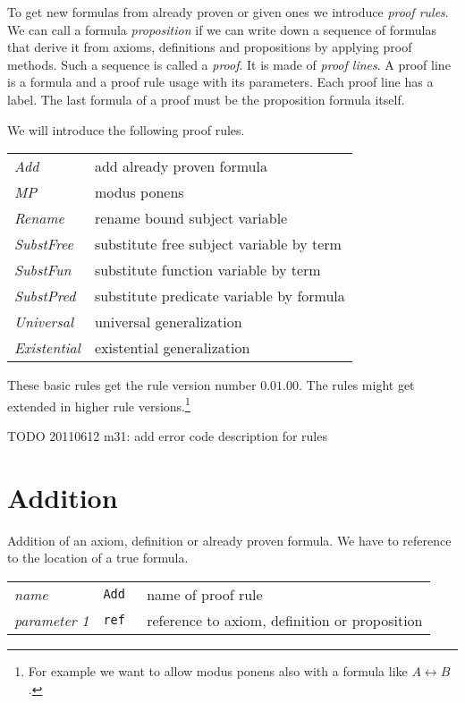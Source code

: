 \documentclass[a4paper,german,10pt,twoside]{book}
\theoremstyle{definition}
\theoremstyle{remark}
\begin{document}
To get new formulas from already proven or given ones we introduce \emph{proof rules}. We can call a formula \emph{proposition} if we can write down a sequence of formulas that derive it from axioms, definitions and propositions by applying proof methods. Such a sequence is called a \emph{proof}. It is made of \emph{proof lines}. A proof line is a formula and a proof rule usage with its parameters. Each proof line has a label. The last formula of a proof must be the proposition formula itself. 


\par
We will introduce the following proof rules. 

\par
\begin{tabularx}{\columnwidth}{ll}
  \emph{Add}         & add already proven formula  \\
  \emph{MP}          & modus ponens  \\
  \emph{Rename}      & rename bound subject variable  \\
  \emph{SubstFree}   & substitute free subject variable by term  \\
  \emph{SubstFun}    & substitute function variable by term  \\
  \emph{SubstPred}   & substitute predicate variable by formula \\
  \emph{Universal}   & universal generalization  \\
  \emph{Existential} & existential generalization
\end{tabularx}

\par
These basic rules get the rule version number $0.01.00$. The rules might get extended in higher rule versions.\footnote{For example we want to allow modus ponens also with a formula like $A \leftrightarrow B$.}

\par
TODO 20110612 m31: add error code description for rules

\section{Addition} \label{chapter6_section1} \hypertarget{chapter6_section1}{}
Addition of an axiom, definition or already proven formula. We have to reference to the location of a true formula.

\par
\begin{tabularx}{\columnwidth}{lll}
  \emph{name}        & \tt{Add}  & name of proof rule \\
  \emph{parameter 1} & \tt{ref}  & reference to axiom, definition or proposition
\end{tabularx}
\end{document}
